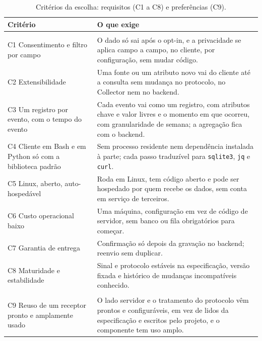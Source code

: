 \begin{table}[!ht]
  \centering
  \caption{Critérios da escolha: requisitos (C1 a C8) e preferências (C9).}
  \label{tab:criterios}
  \footnotesize
  \begin{tabular}{@{}>{\raggedright\arraybackslash}p{4.6cm}
                    >{\raggedright\arraybackslash}p{9.6cm}@{}}
    \toprule
    Critério & O que exige \\
    \midrule
    \multicolumn{2}{@{}l}{\textit{Requisitos}} \\
    \addlinespace[2pt]
    C1 Consentimento e filtro por campo
      & O dado só sai após o opt-in, e a privacidade se aplica
        campo a campo, no cliente, por configuração, sem mudar código.\\
    \addlinespace[1pt]
    C2 Extensibilidade
      & Uma fonte ou um atributo novo vai do cliente até a consulta sem
        mudança no protocolo, no Collector nem no backend.\\
    \addlinespace[1pt]
    C3 Um registro por evento, com o tempo do evento
      & Cada evento vai como um registro, com atributos chave e valor livres e
        o momento em que ocorreu, com granularidade de semana; a agregação fica com o backend.\\
    \addlinespace[1pt]
    C4 Cliente em Bash e em Python só com a biblioteca padrão
      & Sem processo residente nem dependência instalada à parte; cada passo
        traduzível para \texttt{sqlite3}, \texttt{jq} e \texttt{curl}.\\
    \addlinespace[1pt]
    C5 Linux, aberto, auto-hospedável
      & Roda em Linux, tem código aberto e pode ser hospedado por quem recebe
        os dados, sem conta em serviço de terceiros.\\
    \addlinespace[1pt]
    C6 Custo operacional baixo
      & Uma máquina, configuração em vez de código de servidor, sem banco ou
        fila obrigatórios para começar.\\
    \addlinespace[1pt]
    C7 Garantia de entrega
      & Confirmação só depois da gravação no backend; reenvio sem duplicar.\\
    \addlinespace[1pt]
    C8 Maturidade e estabilidade
      & Sinal e protocolo estáveis na especificação, versão fixada e histórico
        de mudanças incompatíveis conhecido.\\
    \midrule
    \multicolumn{2}{@{}l}{\textit{Preferências}} \\
    \addlinespace[2pt]
    C9 Reuso de um receptor pronto e amplamente usado
      & O lado servidor e o tratamento do protocolo vêm prontos e
        configuráveis, em vez de lidos da especificação e escritos pelo
        projeto, e o componente tem uso amplo.\\
    \bottomrule
  \end{tabular}
\end{table}
